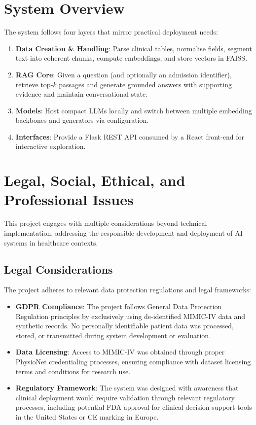 \section{System Overview}
The system follows four layers that mirror practical deployment needs:
\begin{enumerate}
  \item \textbf{Data Creation \& Handling}: Parse clinical tables, normalise fields, segment text into coherent chunks, compute embeddings, and store vectors in FAISS.
  \item \textbf{RAG Core}: Given a question (and optionally an admission identifier), retrieve top-$k$ passages and generate grounded answers with supporting evidence and maintain conversational state.
  \item \textbf{Models}: Host compact LLMs locally and switch between multiple embedding backbones and generators via configuration.
  \item \textbf{Interfaces}: Provide a Flask REST API consumed by a React front-end for interactive exploration.
\end{enumerate}

\section{Legal, Social, Ethical, and Professional Issues}

This project engages with multiple considerations beyond technical implementation, addressing the responsible development and deployment of AI systems in healthcare contexts.

\subsection{Legal Considerations}

The project adheres to relevant data protection regulations and legal frameworks:

\begin{itemize}
    \item \textbf{GDPR Compliance}: The project follows General Data Protection Regulation principles by exclusively using de-identified MIMIC-IV data and synthetic records. No personally identifiable patient data was processed, stored, or transmitted during system development or evaluation.
    
    \item \textbf{Data Licensing}: Access to MIMIC-IV was obtained through proper PhysioNet credentialing processes, ensuring compliance with dataset licensing terms and conditions for research use.
    
    \item \textbf{Regulatory Framework}: The system was designed with awareness that clinical deployment would require validation through relevant regulatory processes, including potential FDA approval for clinical decision support tools in the United States or CE marking in Europe.
\end{itemize}

